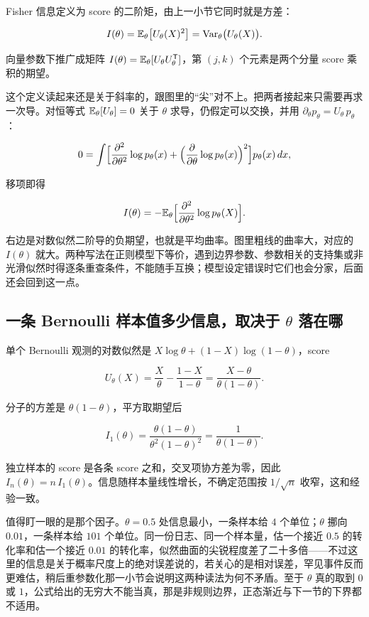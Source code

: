 Fisher 信息定义为 score 的二阶矩，由上一小节它同时就是方差：

\[
I(\theta)=\mathbb{E}_\theta\bigl[U_\theta(X)^2\bigr]=\operatorname{Var}_\theta\bigl(U_\theta(X)\bigr).
\]

向量参数下推广成矩阵 \(I(\theta)=\mathbb{E}_\theta[U_\theta U_\theta^{\mathsf{T}}]\)，第 \((j,k)\) 个元素是两个分量 score 乘积的期望。

这个定义读起来还是关于斜率的，跟图里的``尖''对不上。把两者接起来只需要再求一次导。对恒等式 \(\mathbb{E}_\theta[U_\theta]=0\) 关于 \(\theta\) 求导，仍假定可以交换，并用 \(\partial_\theta p_\theta=U_\theta\,p_\theta\)：

\[
0=\int\Bigl[\frac{\partial^2}{\partial\theta^2}\log p_\theta(x)+\Bigl(\frac{\partial}{\partial\theta}\log p_\theta(x)\Bigr)^2\Bigr]p_\theta(x)\,dx,
\]

移项即得

\[
I(\theta)=-\mathbb{E}_\theta\Bigl[\frac{\partial^2}{\partial\theta^2}\log p_\theta(X)\Bigr].
\]

右边是对数似然二阶导的负期望，也就是平均曲率。图里粗线的曲率大，对应的 \(I(\theta)\) 就大。两种写法在正则模型下等价，遇到边界参数、参数相关的支持集或非光滑似然时得逐条重查条件，不能随手互换；模型设定错误时它们也会分家，后面还会回到这一点。

\subsection{一条 Bernoulli 样本值多少信息，取决于 \(\theta\) 落在哪}

单个 Bernoulli 观测的对数似然是 \(X\log\theta+(1-X)\log(1-\theta)\)，score

\[
U_\theta(X)=\frac{X}{\theta}-\frac{1-X}{1-\theta}=\frac{X-\theta}{\theta(1-\theta)}.
\]

分子的方差是 \(\theta(1-\theta)\)，平方取期望后

\[
I_1(\theta)=\frac{\theta(1-\theta)}{\theta^2(1-\theta)^2}=\frac{1}{\theta(1-\theta)}.
\]

独立样本的 score 是各条 score 之和，交叉项协方差为零，因此 \(I_n(\theta)=n\,I_1(\theta)\)。信息随样本量线性增长，不确定范围按 \(1/\sqrt n\) 收窄，这和经验一致。

值得盯一眼的是那个因子。\(\theta=0.5\) 处信息最小，一条样本给 \(4\) 个单位；\(\theta\) 挪向 \(0.01\)，一条样本给 \(101\) 个单位。同一份日志、同一个样本量，估一个接近 \(0.5\) 的转化率和估一个接近 \(0.01\) 的转化率，似然曲面的尖锐程度差了二十多倍——不过这里的信息是关于概率尺度上的绝对误差说的，若关心的是相对误差，罕见事件反而更难估，稍后重参数化那一小节会说明这两种读法为何不矛盾。至于 \(\theta\) 真的取到 \(0\) 或 \(1\)，公式给出的无穷大不能当真，那是非规则边界，正态渐近与下一节的下界都不适用。

